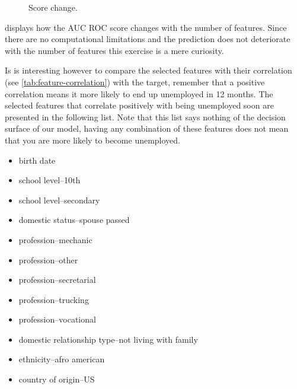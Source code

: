 \begin{figure}[!h]
    \caption{Score change.}
    \label{fig:score-features}
    \centering
    \scalebox{0.5}{}
\end{figure}


 displays how the AUC ROC score changes with  the number of features.
Since there are no computational limitations and the prediction does not
deteriorate with the number of features this exercise is a mere curiosity.

Is is interesting however to compare the selected features with their
correlation (see \vref{tab:feature-correlation}) with the target,
remember that a positive correlation means it more likely to end up
unemployed in 12 months.
The selected features that correlate positively with being unemployed
soon are presented in the following list.
Note that this list says nothing of the decision surface of our model,
having any combination of these features does not mean that you are
more likely to become unemployed.
\begin{itemize}
    \item birth date
    \item school level--10th
    \item school level--secondary
    \item domestic status--spouse passed
    \item profession--mechanic
    \item profession--other
    \item profession--secretarial
    \item profession--trucking
    \item profession--vocational
    \item domestic relationship type--not living with family
    \item ethnicity--afro american
    \item country of origin--US
\end{itemize}


